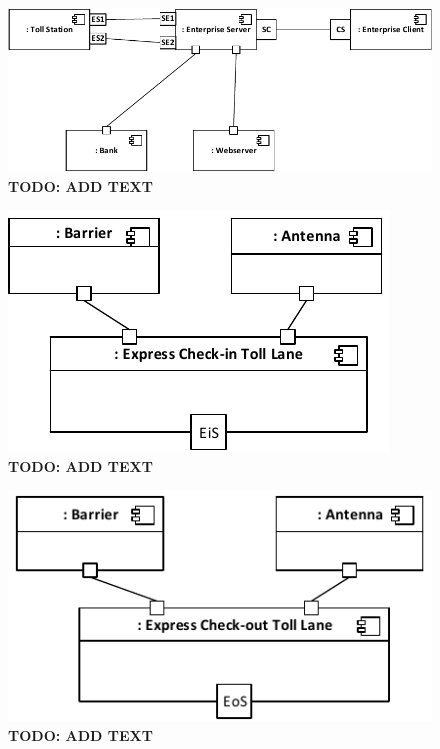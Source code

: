 \begin{figure}
\centerline{\includegraphics[width=\textwidth]{img/composite_structure_diagrams/cscd_enterprise}}
\caption{\textbf{TODO: ADD TEXT}}
\label{fig:csd_e}
\end{figure}

\begin{figure}
\centerline{\includegraphics[width=\textwidth]{img/composite_structure_diagrams/cscd_toll_lane_express_in}}
\caption{\textbf{TODO: ADD TEXT}}
\label{fig:csd_tlei}
\end{figure}

\begin{figure}
\centerline{\includegraphics[width=\textwidth]{img/composite_structure_diagrams/cscd_toll_lane_express_out}}
\caption{\textbf{TODO: ADD TEXT}}
\label{fig:csd_tleo}
\end{figure}

